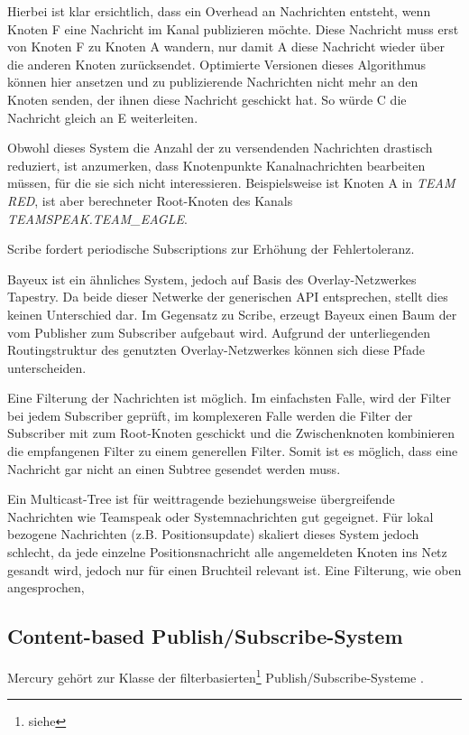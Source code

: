 Hierbei ist klar ersichtlich, dass ein Overhead an Nachrichten entsteht, wenn Knoten F eine Nachricht im Kanal publizieren möchte. Diese Nachricht muss erst von Knoten F zu Knoten A wandern, nur damit A diese Nachricht wieder über die anderen Knoten zurücksendet. Optimierte Versionen dieses Algorithmus können hier ansetzen und zu publizierende Nachrichten nicht mehr an den Knoten senden, der ihnen diese Nachricht geschickt hat. So würde C die Nachricht gleich an E weiterleiten.


Obwohl dieses System die Anzahl der zu versendenden Nachrichten drastisch reduziert, ist anzumerken, dass Knotenpunkte Kanalnachrichten bearbeiten müssen, für die sie sich nicht interessieren. Beispielsweise ist Knoten A in \emph{TEAM RED}, ist aber berechneter Root-Knoten des Kanals \emph{TEAMSPEAK.TEAM\_EAGLE}.

Scribe fordert periodische Subscriptions zur Erhöhung der Fehlertoleranz.

Bayeux \cite{Zhuang2001} ist ein ähnliches System, jedoch auf Basis des Overlay-Netzwerkes Tapestry. Da beide dieser Netwerke der generischen API entsprechen, stellt dies keinen Unterschied dar. Im Gegensatz zu Scribe, erzeugt Bayeux einen Baum der vom Publisher zum Subscriber aufgebaut wird. Aufgrund der unterliegenden Routingstruktur des genutzten Overlay-Netzwerkes können sich diese Pfade unterscheiden.


Eine Filterung der Nachrichten ist möglich. Im einfachsten Falle, wird der Filter bei jedem Subscriber geprüft, im komplexeren Falle werden die Filter der Subscriber mit zum Root-Knoten geschickt und die Zwischenknoten kombinieren die empfangenen Filter zu einem generellen Filter. Somit ist es möglich, dass eine Nachricht gar nicht an einen Subtree gesendet werden muss.


Ein Multicast-Tree ist für weittragende beziehungsweise übergreifende Nachrichten wie Teamspeak oder Systemnachrichten gut gegeignet. Für lokal bezogene Nachrichten (z.B. Positionsupdate) skaliert dieses System jedoch schlecht, da jede einzelne Positionsnachricht alle angemeldeten Knoten ins Netz gesandt wird, jedoch nur für einen Bruchteil relevant ist. Eine Filterung, wie oben angesprochen, 



\subsection*{Content-based Publish/Subscribe-System}
\label{chap:related:mercury}
Mercury \cite{Bharambe2004Mercury} gehört zur Klasse der filterbasierten\footnote{siehe } Publish/Subscribe-Systeme .

